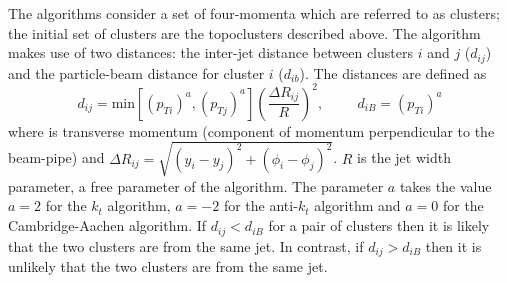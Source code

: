 The algorithms consider a set of four-momenta which are referred to as clusters;
the initial set of clusters are the topoclusters described above.
The algorithm makes use of two distances: the inter-jet distance between clusters $i$ and $j$ ($d_{ij}$) 
and the particle-beam distance for cluster $i$ ($d_{ib}$). The distances are defined as
\begin{equation}
  d_{ij} = \text{min}[(p_{ Ti})^a, (p_{ Tj})^a]  \left(\frac{\Delta  R_{ij}}{R}\right) ^2, \hspace{1cm}  d_{iB} = (p_{Ti})^a  \label{dij}
\end{equation}
where \pT{} is transverse momentum (component of momentum perpendicular to the beam-pipe)
and $\Delta R_{ij} = \sqrt{(y_{i}-y_{j})^2 + (\phi_{i}-\phi_{j})^2}$.
$R$ is the jet width parameter, a free parameter of the algorithm.
The parameter $a$ takes the value $a = 2$ for the $k_t$ algorithm, $a = -2$ for the anti-$k_t$ algorithm 
and  $a = 0$ for the Cambridge-Aachen algorithm.
If $d_{ij} < d_{iB}$ for a pair of clusters then it is likely that the two clusters are from the same jet. 
In contrast, if $d_{ij} > d_{iB}$ then it is unlikely that the two clusters are from the same jet.

 

